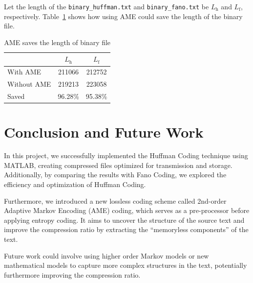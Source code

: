 \documentclass[12pt,twoside]{article}
\begin{document}
Let the length of the \texttt{binary\_huffman.txt} and \texttt{binary\_fano.txt} be $L_{\text{h}}$ and $L_{\text{f}}$, respectively. Table~\ref{tab:amematrics} shows how using AME could save the length of the binary file.

\begin{table}[h!]
    \caption{AME saves the length of binary file}
    \label{tab:amematrics}
    \centering
    \begin{tabular}{lcc}
    \toprule
     & $L_{\text{h}}$ & $L_{\text{f}}$ \\ \hline
    With AME & 211066 & 212752  \\ 
    Without AME & 219213 & 223058 \\ 
    Saved & 96.28\% & 95.38\% \\ 
    \bottomrule
    \end{tabular}
\end{table}




\section{Conclusion and Future Work}

In this project, we successfully implemented the Huffman Coding technique using MATLAB, creating compressed files optimized for transmission and storage. Additionally, by comparing the results with Fano Coding, we explored the efficiency and optimization of Huffman Coding.

Furthermore, we introduced a new lossless coding scheme called 2nd-order Adaptive Markov Encoding (AME) coding, which serves as a pre-processor before applying entropy coding. It aims to uncover the structure of the source text and improve the compression ratio by extracting the ``memoryless components'' of the text. 

Future work could involve using higher order Markov models or new mathematical models to capture more complex structures in the text, potentially furthermore improving the compression ratio. 
\end{document}
